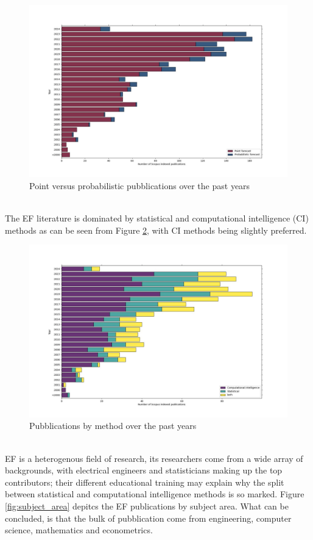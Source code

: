 \begin{figure}
  \includegraphics[width=\textwidth]{images/point_vs_prob.jpg}
  \caption{Point versus probabilistic pubblications over the past years}
  \label{fig:point_vs_prob}
\end{figure}
\\
The EF literature is dominated by statistical and computational intelligence (CI) methods as can be seen from Figure \ref{fig:cs_stat_both}, with CI methods being slightly preferred. 
\begin{figure}
  \includegraphics[width=\textwidth]{images/cs_stat_both.jpg}
  \caption{Pubblications by method over the past years}
  \label{fig:cs_stat_both}
\end{figure}
\\
EF is a heterogenous field of research, its researchers come from a wide array of backgrounds, with electrical engineers and statisticians making up the top contributors; their different educational training may explain why the split between statistical and computational intelligence methods is so marked. Figure \ref{fig:subject_area} depitcs the EF publications by subject area. What can be concluded, is that the bulk of pubblication come from engineering, computer science, mathematics and econometrics.
